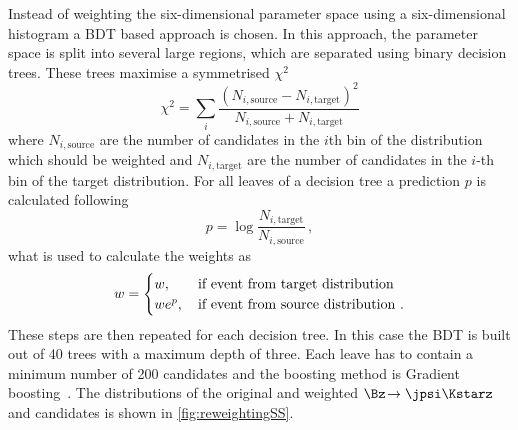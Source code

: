 Instead of weighting the six-dimensional parameter space using a six-dimensional histogram a BDT based approach is chosen.
In this approach, the parameter space is split into several large regions, which are separated using binary decision trees.
These trees maximise a symmetrised $\chi^2$
\begin{equation}
\chi^2=\sum_{i}\frac{\left(N_{i,\text{source}}-N_{i,\text{target}}\right)^2}{N_{i,\text{source}}+N_{i,\text{target}}}
\end{equation}
where $N_{i,\text{source}}$ are the number of candidates in the $i$th bin of the distribution which should be weighted and $N_{i,\text{target}}$ are the number of candidates in the $i$-th bin of the target distribution.
For all leaves of a decision tree a prediction $p$ is calculated following
\begin{equation}
p=\log\frac{N_{i,\text{target}}}{N_{i,\text{source}}}\,,
\end{equation}
what is used to calculate the weights as
\begin{equation}
w=\begin{cases} w, &\, \text{if event from target distribution}\\ we^{p}, &\, \text{if event from source distribution\,\,.} \end{cases}
\end{equation}
These steps are then repeated for each decision tree.
In this case the BDT is built out of \num{40} trees with a maximum depth of three.
Each leave has to contain a minimum number of \num{200} candidates and the boosting method is Gradient boosting~\cite{Friedman00greedyfunction}.
The distributions of the original and weighted $\Bz\!\to\jpsi\Kstarz$ and \BdToDpi candidates is shown in \cref{fig:reweightingSS}.
